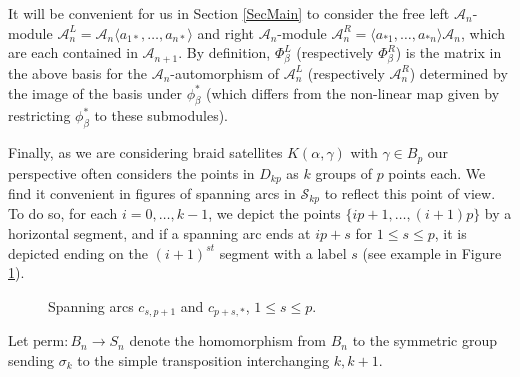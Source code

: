 \documentclass[11pt]{amsart}
\def\A{{\mathcal A}}
\def\s{{\sigma}}
\theoremstyle{definition}
\begin{document}
  It will be convenient for us in Section \ref{SecMain} to consider the free left $\A_n$-module $\A_n^L = \A_n\langle a_{1\ast},\ldots,a_{n\ast} \rangle$ and right $\A_n$-module $\A_n^R = \langle a_{\ast 1},\ldots,a_{\ast n} \rangle\A_n$, which are each contained in $\A_{n+1}$. By definition, $\Phi_\beta^L$ (respectively $\Phi_\beta^R$) is the matrix in the above basis for the $\A_n$-automorphism of $\A_n^L$ (respectively $\A_n^R$) determined by the image of the basis under $\phi^\ast_\beta$ (which differs from the non-linear map given by restricting $\phi^\ast_\beta$ to these submodules).

  Finally, as we are considering braid satellites $K(\alpha,\gamma)$ with $\gamma\in B_p$ our perspective often considers the points in $D_{kp}$ as $k$ groups of $p$ points each. We find it convenient in figures of spanning arcs in $\mathscr S_{kp}$ to reflect this point of view. To do so, for each $i=0,\ldots,k-1$, we depict the points $\{ip+1,\ldots, (i+1)p\}$ by a horizontal segment, and if a spanning arc ends at $ip+s$ for $1\le s\le p$, it is depicted ending on the $(i+1)^{st}$ segment with a label $s$ (see example in Figure \ref{FigExSpanArckp}).

  \begin{figure}[ht]
      \caption{Spanning arcs $c_{s,p+1}$ and $c_{p+s,\ast}$, $1\le s\le p$.}
      \label{FigExSpanArckp}
    \end{figure}

  Let $\text{perm}:B_n\to S_n$ denote the homomorphism from $B_n$ to the symmetric group sending $\s_k$ to the simple transposition interchanging $k, k+1$.
\end{document}
